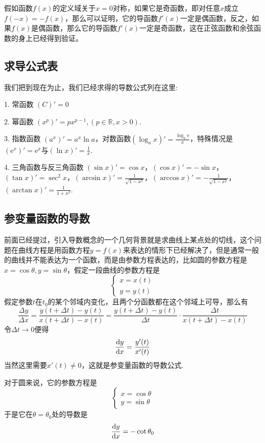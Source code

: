 \begin{example}
  假如函数$f(x)$的定义域关于$x=0$对称，如果它是奇函数，即对任意$x$成立$f(-x)=-f(x)$，那么可以证明，它的导函数$f'(x)$一定是偶函数，反之，如果$f(x)$是偶函数，那么它的导函数$f'(x)$一定是奇函数，这在正弦函数和余弦函数的身上已经得到验证。
\end{example}

\subsection{求导公式表}
\label{sec:table-of-derivative-formule}

我们把到现在为止，我们已经求得的导数公式列在这里:

1. 常函数 $(C)' = 0$

2. 幂函数 $(x^p)' = p x^{p-1}, (p \in \mathbb{R},x>0)$.

3. 指数函数 $(a^x)' = a^x \ln{a}$，对数函数$(\log_a x)' = \frac{\log_a \mathrm{e}}{x}$，特殊情况是 $(\mathrm{e}^x)' = \mathrm{e}^x$与$(\ln{x})'=\frac{1}{x}$.

4. 三角函数与反三角函数 $(\sin{x})' = \cos{x}$，$(\cos{x})'=-\sin{x}$，$(\tan{x})'=\sec^2{x}$，$(\arcsin{x})' = \frac{1}{\sqrt{1-x^2}}$，$(\arccos{x})'= - \frac{1}{\sqrt{1-x^2}}$，$(\arctan{x})' = \frac{1}{1+x^2}$.

\subsection{参变量函数的导数}
\label{sec:derivative-of-parametered-function}

前面已经提过，引入导数概念的一个几何背景就是求曲线上某点处的切线，这个问题在曲线方程是用函数方程$y=f(x)$来表达的情形下已经解决了，但是通常一般的曲线并不能表达为一个函数，而是由参数方程表达的，比如圆的参数方程是$x=\cos{\theta},y=\sin{\theta}$，假定一段曲线的参数方程是
\[
  \begin{cases}
    x = x(t) \\
    y = y(t)
  \end{cases}
\]
假定参数$t$在$t_0$的某个邻域内变化，且两个分函数都在这个邻域上可导，那么有
\[ \frac{\Delta y}{\Delta x} = \frac{y(t+\Delta t)-y(t)}{x(t+\Delta t)-x(t)} = \frac{y(t+\Delta t)-y(t)}{\Delta t} \cdot \frac{\Delta t}{x(t+\Delta t)-x(t)} \]
令$\Delta t \to 0$便得
\[ \frac{\mathop{}\!\mathrm{d} y}{\mathop{}\!\mathrm{d} x} = \frac{y'(t)}{x'(t)} \]
当然这里需要$x'(t) \neq 0$，这就是参变量函数的导数公式.

\begin{example}
  对于圆来说，它的参数方程是
  \[
    \begin{cases}
      x=\cos{\theta} \\
      y = \sin{\theta}
    \end{cases}
  \]
  于是它在$\theta=\theta_0$处的导数是
  \[ \frac{\mathop{}\!\mathrm{d} y}{\mathop{}\!\mathrm{d} x} = -\cot{\theta_0} \]
\end{example}

